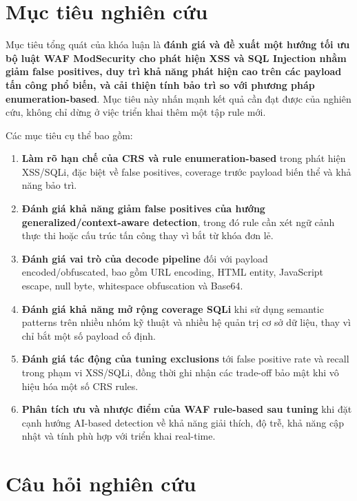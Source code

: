 \section{Mục tiêu nghiên cứu}
\label{sec:objectives}

Mục tiêu tổng quát của khóa luận là \textbf{đánh giá và đề xuất một hướng tối ưu bộ luật WAF ModSecurity cho phát hiện XSS và SQL Injection nhằm giảm false positives, duy trì khả năng phát hiện cao trên các payload tấn công phổ biến, và cải thiện tính bảo trì so với phương pháp enumeration-based}. Mục tiêu này nhấn mạnh kết quả cần đạt được của nghiên cứu, không chỉ dừng ở việc triển khai thêm một tập rule mới.

Các mục tiêu cụ thể bao gồm:

\begin{enumerate}
    \item \textbf{Làm rõ hạn chế của CRS và rule enumeration-based} trong phát hiện XSS/SQLi, đặc biệt về false positives, coverage trước payload biến thể và khả năng bảo trì.

    \item \textbf{Đánh giá khả năng giảm false positives của hướng generalized/context-aware detection}, trong đó rule cần xét ngữ cảnh thực thi hoặc cấu trúc tấn công thay vì bắt từ khóa đơn lẻ.

    \item \textbf{Đánh giá vai trò của decode pipeline} đối với payload encoded/obfuscated, bao gồm URL encoding, HTML entity, JavaScript escape, null byte, whitespace obfuscation và Base64.

    \item \textbf{Đánh giá khả năng mở rộng coverage SQLi} khi sử dụng semantic patterns trên nhiều nhóm kỹ thuật và nhiều hệ quản trị cơ sở dữ liệu, thay vì chỉ bắt một số payload cố định.

    \item \textbf{Đánh giá tác động của tuning exclusions} tới false positive rate và recall trong phạm vi XSS/SQLi, đồng thời ghi nhận các trade-off bảo mật khi vô hiệu hóa một số CRS rules.

    \item \textbf{Phân tích ưu và nhược điểm của WAF rule-based sau tuning} khi đặt cạnh hướng AI-based detection về khả năng giải thích, độ trễ, khả năng cập nhật và tính phù hợp với triển khai real-time.
\end{enumerate}

\section{Câu hỏi nghiên cứu}
\label{sec:research-questions}


